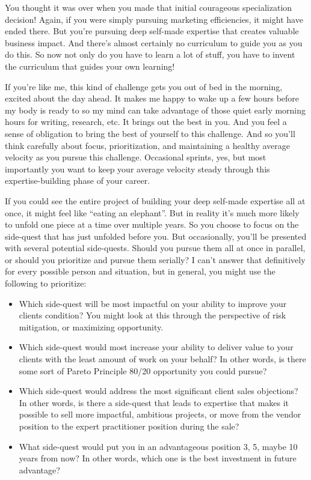 You thought it was over when you made that initial courageous specialization decision! Again, if you were simply pursuing marketing efficiencies, it might have ended there. But you're pursuing deep self-made expertise that creates valuable business impact. And there's almost certainly no curriculum to guide you as you do this. So now not only do you have to learn a lot of stuff, you have to invent the curriculum that guides your own learning!

If you're like me, this kind of challenge gets you out of bed in the morning, excited about the day ahead. It makes me happy to wake up a few hours before my body is ready to so my mind can take advantage of those quiet early morning hours for writing, research, etc. It brings out the best in you. And you feel a sense of obligation to bring the best of yourself to this challenge. And so you'll think carefully about focus, prioritization, and maintaining a healthy average velocity as you pursue this challenge. Occasional sprints, yes, but most importantly you want to keep your average velocity steady through this expertise-building phase of your career.

If you could see the entire project of building your deep self-made expertise all at once, it might feel like ``eating an elephant''. But in reality it's much more likely to unfold one piece at a time over multiple years. So you choose to focus on the side-quest that has just unfolded before you. But occasionally, you'll be presented with several potential side-quests. Should you pursue them all at once in parallel, or should you prioritize and pursue them serially? I can't answer that definitively for every possible person and situation, but in general, you might use the following to prioritize:

\begin{itemize}
\item Which side-quest will be most impactful on your ability to improve your clients condition? You might look at this through the perspective of risk mitigation, or maximizing opportunity.
\item Which side-quest would most increase your ability to deliver value to your clients with the least amount of work on your behalf? In other words, is there some sort of Pareto Principle 80/20 opportunity you could pursue?
\item Which side-quest would address the most significant client sales objections? In other words, is there a side-quest that leads to expertise that makes it possible to sell more impactful, ambitious projects, or move from the vendor position to the expert practitioner position during the sale?
\item What side-quest would put you in an advantageous position 3, 5, maybe 10 years from now? In other words, which one is the best investment in future advantage?
\end{itemize}

